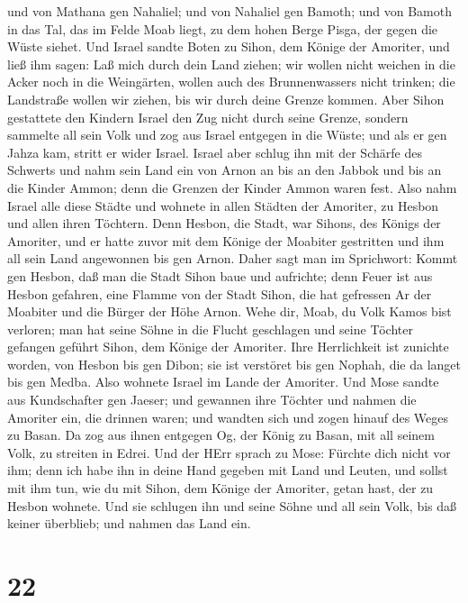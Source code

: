  und von Mathana gen Nahaliel; und von Nahaliel gen Bamoth;
 und von Bamoth in das Tal, das im Felde Moab liegt, zu dem
hohen Berge Pisga, der gegen die Wüste siehet.  Und Israel
sandte Boten zu Sihon, dem Könige der Amoriter, und ließ ihm sagen:
 Laß mich durch dein Land ziehen; wir wollen nicht weichen
in die Acker noch in die Weingärten, wollen auch des Brunnenwassers
nicht trinken; die Landstraße wollen wir ziehen, bis wir durch deine
Grenze kommen.  Aber Sihon gestattete den Kindern Israel
den Zug nicht durch seine Grenze, sondern sammelte all sein Volk und zog
aus Israel entgegen in die Wüste; und als er gen Jahza kam, stritt er
wider Israel.  Israel aber schlug ihn mit der Schärfe des
Schwerts und nahm sein Land ein von Arnon an bis an den Jabbok und bis
an die Kinder Ammon; denn die Grenzen der Kinder Ammon waren fest.
 Also nahm Israel alle diese Städte und wohnete in allen
Städten der Amoriter, zu Hesbon und allen ihren Töchtern. 
Denn Hesbon, die Stadt, war Sihons, des Königs der Amoriter, und er
hatte zuvor mit dem Könige der Moabiter gestritten und ihm all sein Land
angewonnen bis gen Arnon.  Daher sagt man im Sprichwort:
Kommt gen Hesbon, daß man die Stadt Sihon baue und aufrichte;
 denn Feuer ist aus Hesbon gefahren, eine Flamme von der
Stadt Sihon, die hat gefressen Ar der Moabiter und die Bürger der Höhe
Arnon.  Wehe dir, Moab, du Volk Kamos bist verloren; man
hat seine Söhne in die Flucht geschlagen und seine Töchter gefangen
geführt Sihon, dem Könige der Amoriter.  Ihre Herrlichkeit
ist zunichte worden, von Hesbon bis gen Dibon; sie ist verstöret bis gen
Nophah, die da langet bis gen Medba.  Also wohnete Israel
im Lande der Amoriter.  Und Mose sandte aus Kundschafter
gen Jaeser; und gewannen ihre Töchter und nahmen die Amoriter ein, die
drinnen waren;  und wandten sich und zogen hinauf des Weges
zu Basan. Da zog aus ihnen entgegen Og, der König zu Basan, mit all
seinem Volk, zu streiten in Edrei.  Und der HErr sprach zu
Mose: Fürchte dich nicht vor ihm; denn ich habe ihn in deine Hand
gegeben mit Land und Leuten, und sollst mit ihm tun, wie du mit Sihon,
dem Könige der Amoriter, getan hast, der zu Hesbon wohnete.
 Und sie schlugen ihn und seine Söhne und all sein Volk,
bis daß keiner überblieb; und nahmen das Land ein.

\hypertarget{section-21}{%
\section{22}\label{section-21}}

